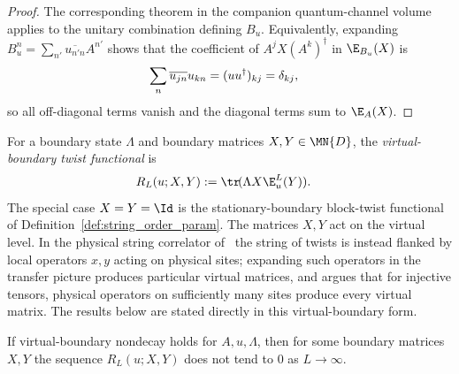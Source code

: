 \begin{proof}\leanok
    The corresponding theorem in the companion quantum-channel volume~\cite[``Unitary freedom in Kraus operators'']{QICLean2026Blueprint} applies to the
    unitary combination defining $B_u$. Equivalently, expanding
    $B_u^n=\sum_{n'}\overline{u_{n'n}}A^{n'}$ shows that the coefficient of
    $A^jX(A^k)^\dagger$ in $\E_{B_u}(X)$ is
    \begin{align}
        \sum_n\overline{u_{jn}}u_{kn}
         & =(uu^\dagger)_{kj}=\delta_{kj},
        \notag
    \end{align}
    so all off-diagonal terms vanish and the diagonal terms sum to $\E_A(X)$.
\end{proof}

\begin{definition}%
    \label{def:string_order_boundary_param}
    \leanok
    For a boundary state $\Lambda$ and boundary matrices $X,Y \in \MN{D}$, the
    \emph{virtual-boundary twist functional} is
    \begin{align}
        R_L(u;X,Y)
         & := \tr\!(\Lambda X \E_u^L(Y)).
        \label{eq:symmetry_boundary_string}
    \end{align}
    The special case $X=Y=\Id$ is the stationary-boundary block-twist
    functional of Definition~\ref{def:string_order_param}. The matrices $X,Y$
    act on the virtual level. In the physical string correlator
    of~\cite{PerezGarcia2008StringOrder} the string of twists is instead
    flanked by local operators $x,y$ acting on physical sites; expanding
    such operators in the transfer picture produces particular virtual
    matrices, and \cite{PerezGarcia2008StringOrder} argues that for
    injective tensors, physical operators on sufficiently many sites
    produce every virtual matrix. The results below are stated directly
    in this virtual-boundary form.
\end{definition}

\begin{lemma}
    \label{lem:not_tendsto_zero_of_hasStringOrder}
    \leanok
    If virtual-boundary nondecay holds for $A,u,\Lambda$, then for some boundary
    matrices $X,Y$ the sequence $R_L(u;X,Y)$ does not tend to $0$ as
    $L\to\infty$.
\end{lemma}

